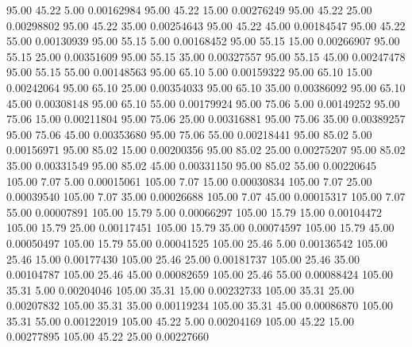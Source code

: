      95.00     45.22      5.00     0.00162984
     95.00     45.22     15.00     0.00276249
     95.00     45.22     25.00     0.00298802
     95.00     45.22     35.00     0.00254643
     95.00     45.22     45.00     0.00184547
     95.00     45.22     55.00     0.00130939
     95.00     55.15      5.00     0.00168452
     95.00     55.15     15.00     0.00266907
     95.00     55.15     25.00     0.00351609
     95.00     55.15     35.00     0.00327557
     95.00     55.15     45.00     0.00247478
     95.00     55.15     55.00     0.00148563
     95.00     65.10      5.00     0.00159322
     95.00     65.10     15.00     0.00242064
     95.00     65.10     25.00     0.00354033
     95.00     65.10     35.00     0.00386092
     95.00     65.10     45.00     0.00308148
     95.00     65.10     55.00     0.00179924
     95.00     75.06      5.00     0.00149252
     95.00     75.06     15.00     0.00211804
     95.00     75.06     25.00     0.00316881
     95.00     75.06     35.00     0.00389257
     95.00     75.06     45.00     0.00353680
     95.00     75.06     55.00     0.00218441
     95.00     85.02      5.00     0.00156971
     95.00     85.02     15.00     0.00200356
     95.00     85.02     25.00     0.00275207
     95.00     85.02     35.00     0.00331549
     95.00     85.02     45.00     0.00331150
     95.00     85.02     55.00     0.00220645
    105.00      7.07      5.00     0.00015061
    105.00      7.07     15.00     0.00030834
    105.00      7.07     25.00     0.00039540
    105.00      7.07     35.00     0.00026688
    105.00      7.07     45.00     0.00015317
    105.00      7.07     55.00     0.00007891
    105.00     15.79      5.00     0.00066297
    105.00     15.79     15.00     0.00104472
    105.00     15.79     25.00     0.00117451
    105.00     15.79     35.00     0.00074597
    105.00     15.79     45.00     0.00050497
    105.00     15.79     55.00     0.00041525
    105.00     25.46      5.00     0.00136542
    105.00     25.46     15.00     0.00177430
    105.00     25.46     25.00     0.00181737
    105.00     25.46     35.00     0.00104787
    105.00     25.46     45.00     0.00082659
    105.00     25.46     55.00     0.00088424
    105.00     35.31      5.00     0.00204046
    105.00     35.31     15.00     0.00232733
    105.00     35.31     25.00     0.00207832
    105.00     35.31     35.00     0.00119234
    105.00     35.31     45.00     0.00086870
    105.00     35.31     55.00     0.00122019
    105.00     45.22      5.00     0.00204169
    105.00     45.22     15.00     0.00277895
    105.00     45.22     25.00     0.00227660
